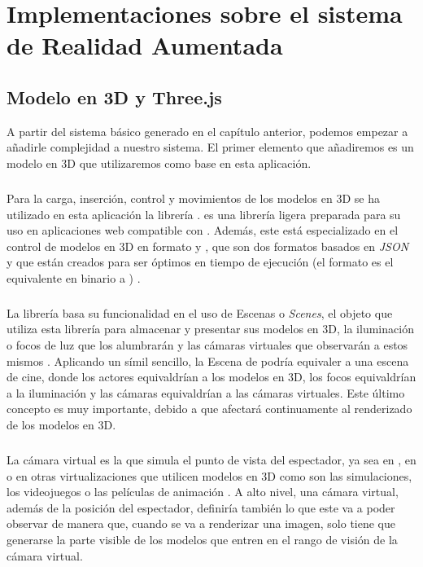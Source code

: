 \documentclass{subfiles}
\begin{document}
    \chapter{Implementaciones sobre el sistema de Realidad Aumentada}
    \label{chap:3}

        \section{Modelo en 3D y Three.js}
        \label{sec:3.1}
        A partir del sistema básico generado en el capítulo anterior, podemos empezar a añadirle complejidad a nuestro sistema. El primer elemento que añadiremos es un modelo en 3D que utilizaremos como base en esta aplicación.

        \paragraph{}
        Para la carga, inserción, control y movimientos de los modelos en 3D se ha utilizado en esta aplicación la librería \threejs. \threejs es una librería ligera preparada para su uso en aplicaciones web compatible con \js \cite{web:wikipediathreejs}. Además, este está especializado en el control de modelos en 3D en formato \glb y \gltf, que son dos formatos basados en \textit{JSON} y que están creados para ser óptimos en tiempo de ejecución (el formato \glb es el equivalente en binario a \gltf) \cite{web:threejs_loading3dmodels}.

        \paragraph{}
        La librería \threejs basa su funcionalidad en el uso de Escenas o \textit{Scenes}, el objeto que utiliza esta librería para almacenar y presentar sus modelos en 3D, la iluminación o focos de luz que los alumbrarán y las cámaras virtuales que observarán a estos mismos \cite{web:threejs_scene}. Aplicando un símil sencillo, la Escena de \threejs podría equivaler a una escena de cine, donde los actores equivaldrían a los modelos en 3D, los focos equivaldrían a la iluminación y las cámaras equivaldrían a las cámaras virtuales. Este último concepto es muy importante, debido a que afectará continuamente al renderizado de los modelos en 3D.

        \paragraph{}
        La cámara virtual es la que simula el punto de vista del espectador, ya sea en \ra, en \rv o en otras virtualizaciones que utilicen modelos en 3D como son las simulaciones, los videojuegos o las películas de animación \cite{web:mozilla_virtualcamera}. A alto nivel, una cámara virtual, además de la posición del espectador, definiría también lo que este va a poder observar de manera que, cuando se va a renderizar una imagen, solo tiene que generarse la parte visible de los modelos que entren en el rango de visión de la cámara virtual.
\end{document}
